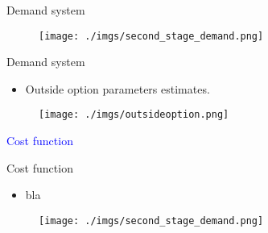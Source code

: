 \documentclass[notes,11pt, aspectratio=169]{beamer}
\begin{document}
\begin{frame}{Demand system}\label{demand}
    \vspace{0.5cm}
      
        \begin{figure}[t*]
          \centering
    
          \texttt{[image: ./imgs/second\_stage\_demand.png]}
       
        \end{figure}

        \hyperlink{firststage}{}
        
      \end{frame}

      \begin{frame}{Demand system}
        \vspace{0.5cm}
          \begin{itemize}
            \item  Outside option parameters estimates. 
          \end{itemize}
          
            \begin{figure}[t*]
              \centering
        
              \texttt{[image: ./imgs/outsideoption.png]}
           
            \end{figure}
    
            
          \end{frame}
    


\begin{frame}
    \textcolor{blue}{\huge{\centerline{Cost function}}}
\end{frame}

\begin{frame}{Cost function}\label{cost}
    \vspace{0.5cm}
      \begin{itemize}
        \item  bla
      \end{itemize}
      
        \begin{figure}[t*]
          \centering
    
          \texttt{[image: ./imgs/second\_stage\_demand.png]}
        \end{figure}

        \hyperlink{costiv}{}
        
      \end{frame}
\end{document}
